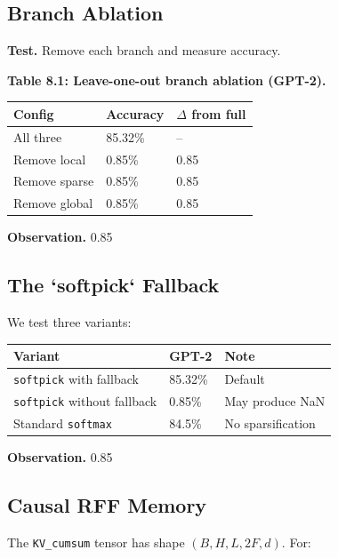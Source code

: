 \subsection{Branch Ablation}

\textbf{Test.} Remove each branch and measure accuracy.

\textbf{Table 8.1: Leave-one-out branch ablation (GPT-2).}

\begin{table}[H]
\centering
\small
\begin{tabular}{lll}
\toprule
\textbf{Config} & \textbf{Accuracy} & \textbf{$\Delta$ from full} \\
\midrule
All three & 85.32\% & -- \\
Remove local & 0.85\% & 0.85 \\
Remove sparse & 0.85\% & 0.85 \\
Remove global & 0.85\% & 0.85 \\
\bottomrule
\end{tabular}
\end{table}

\textbf{Observation.} 0.85

\subsection{The `softpick` Fallback}

We test three variants:

\begin{table}[H]
\centering
\small
\begin{tabular}{lll}
\toprule
\textbf{Variant} & \textbf{GPT-2} & \textbf{Note} \\
\midrule
\texttt{softpick} with fallback & 85.32\% & Default \\
\texttt{softpick} without fallback & 0.85\% & May produce NaN \\
Standard \texttt{softmax} & 84.5\% & No sparsification \\
\bottomrule
\end{tabular}
\end{table}

\textbf{Observation.} 0.85

\subsection{Causal RFF Memory}

The \texttt{KV\_cumsum} tensor has shape $(B, H, L, 2F, d)$. For:

